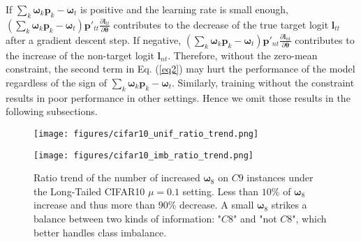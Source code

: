 %
If $\sum_k{{\boldsymbol \omega_k} {\boldsymbol p_k}}-\boldsymbol \omega_t$ is positive and the learning rate is small enough, $\left(\sum_k{{\boldsymbol \omega_k} {\boldsymbol p_k}}-\boldsymbol\omega_t\right) \boldsymbol p'_{tt} \frac{\partial \boldsymbol l_{tt}}{\partial \boldsymbol \theta}$ contributes to the decrease of the true target logit $\boldsymbol l_{tt}$  after a gradient descent step.
If negative,  $\left(\sum_k{{\boldsymbol \omega_k} { \boldsymbol p_k}}-\boldsymbol \omega_t\right) \boldsymbol p'_{nt} \frac{\partial \boldsymbol l_{nt}}{\partial \boldsymbol \theta}$ contributes to the increase of the non-target logit $\boldsymbol l_{nt}$.
%
Therefore, without the zero-mean constraint, the second term in Eq. (\ref{eq2}) may hurt the performance of the model regardless of the sign of $\sum_k{{\boldsymbol \omega_k} {\boldsymbol p_k}}-\boldsymbol \omega_t$.
%
Similarly, training without the constraint results in poor performance in other settings.
%
Hence we omit those results in the following subsections.

\begin{figure}
\centering
\begin{minipage}[t]{.5\textwidth}
  \centering
    \texttt{[image: figures/cifar10\_unif\_ratio\_trend.png]}
    \captionsetup{width=.95\linewidth}
    \caption{Ratio trend of the number of increased $\boldsymbol\omega^c_{nt}$, $\boldsymbol\omega^{n}_{tt}$, and $\boldsymbol\omega^n_{nt}$ under the CIFAR10 40\% uniform noise setting. 
    Around $65\%$ of $\boldsymbol\omega^c_{nt}$ and $\boldsymbol\omega^n_{nt}$ increase since they contain useful information.
    Besides, less than $20\%$ of $\boldsymbol\omega^{n}_{tt}$ increase and thus more than $80\%$ of $\boldsymbol\omega^{n}_{tt}$ decrease since they contain harmful information.
    }
    \label{fig:cifar10_unif_ratio_trend}
\end{minipage}%
\begin{minipage}[t]{.5\textwidth}
  \centering
    \texttt{[image: figures/cifar10\_imb\_ratio\_trend.png]}
    \captionsetup{width=.95\linewidth}
    \caption{Ratio trend of the number of increased $\boldsymbol{\omega}_8$ on $C9$ instances under the Long-Tailed CIFAR10 $\mu=0.1$ setting.
    Less than $10\%$ of $\boldsymbol{\omega}_8$ increase and thus more than $90\%$ decrease.
    A small $\boldsymbol{\omega}_8$ strikes a balance between two kinds of information: "$C8$" and "not $C8$",
    which better handles class imbalance.
    }
    \label{fig:cifar10_imb_ratio_trend}
\end{minipage}
\end{figure}


